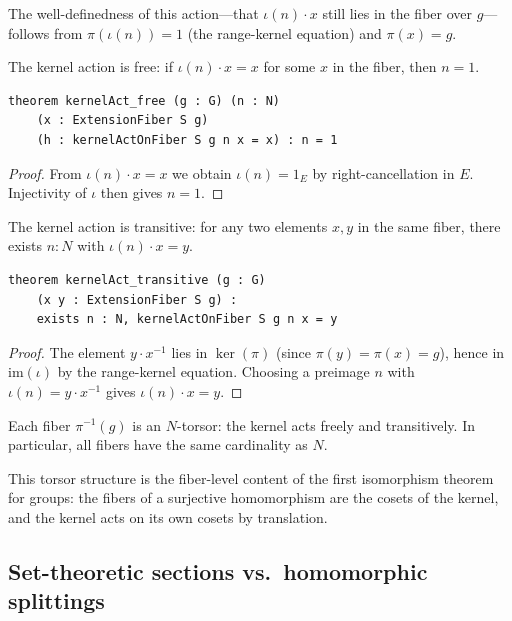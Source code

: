 \documentclass[11pt]{article}
\newcommand{\im}{\mathrm{im}}
\begin{document}
The well-definedness of this action---that $\iota(n) \cdot x$ still lies in the
fiber over $g$---follows from $\pi(\iota(n)) = 1$ (the range-kernel equation) and
$\pi(x) = g$.

\begin{theorem}\label{thm:free}
The kernel action is free: if $\iota(n) \cdot x = x$ for some $x$ in the fiber,
then $n = 1$.
\begin{lstlisting}
theorem kernelAct_free (g : G) (n : N)
    (x : ExtensionFiber S g)
    (h : kernelActOnFiber S g n x = x) : n = 1
\end{lstlisting}
\end{theorem}

\begin{proof}
From $\iota(n) \cdot x = x$ we obtain $\iota(n) = 1_E$ by right-cancellation in
$E$.  Injectivity of $\iota$ then gives $n = 1$.
\end{proof}

\begin{theorem}\label{thm:transitive}
The kernel action is transitive: for any two elements $x, y$ in the same fiber,
there exists $n : N$ with $\iota(n) \cdot x = y$.
\begin{lstlisting}
theorem kernelAct_transitive (g : G)
    (x y : ExtensionFiber S g) :
    exists n : N, kernelActOnFiber S g n x = y
\end{lstlisting}
\end{theorem}

\begin{proof}
The element $y \cdot x^{-1}$ lies in $\ker(\pi)$ (since $\pi(y) = \pi(x) = g$),
hence in $\im(\iota)$ by the range-kernel equation.  Choosing a preimage $n$ with
$\iota(n) = y \cdot x^{-1}$ gives $\iota(n) \cdot x = y$.
\end{proof}

\begin{corollary}\label{cor:torsor}
Each fiber $\pi^{-1}(g)$ is an $N$-torsor: the kernel acts freely and transitively.
In particular, all fibers have the same cardinality as $N$.
\end{corollary}

This torsor structure is the fiber-level content of the first isomorphism theorem
for groups: the fibers of a surjective homomorphism are the cosets of the kernel,
and the kernel acts on its own cosets by translation.

\subsection{Set-theoretic sections vs.\ homomorphic splittings}\label{sec:section-vs-split}
\end{document}
